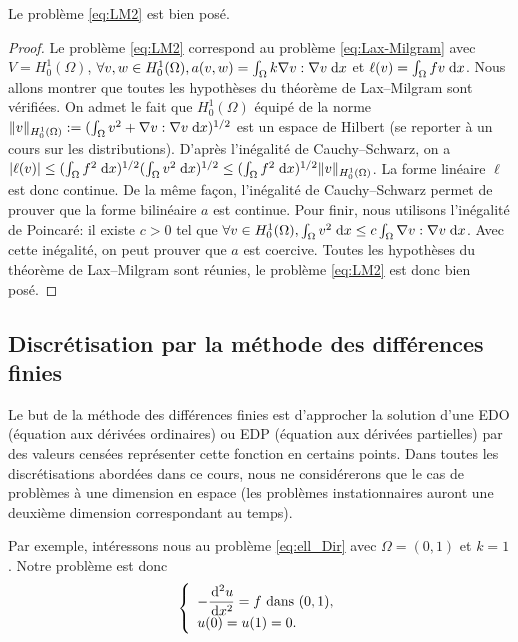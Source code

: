 \documentclass[12pt,a4paper,twoside]{article}
\begin{document}
\begin{proposition}
  Le probl\`eme \eqref{eq:LM2} est bien pos\'e.
\end{proposition}
\begin{proof}
  Le probl\`eme \eqref{eq:LM2} correspond au probl\`eme \eqref{eq:Lax-Milgram}
  avec $V = H_0^1(\Omega)$, 
  $\forall v, w \in H_0^1(\Omega), a(v,w) = \int_{\Omega} k \nabla v : \nabla v \;\mathrm{d} x$
  et $\ell(v) = \int_{\Omega} f v \;\mathrm{d} x$.
  Nous allons montrer que toutes les hypoth\`eses du th\'eor\`eme de Lax--Milgram
  sont v\'erifi\'ees.
  On admet le fait que $H_0^1(\Omega)$ \'equip\'e de la norme 
  $\| v \|_{H_0^1(\Omega)} := (\int_{\Omega} v^2 + \nabla v : \nabla v \;\mathrm{d} x)^{1/2}$ 
  est un espace de Hilbert (se reporter \`a un cours sur les distributions).
  D'apr\`es l'in\'egalit\'e de Cauchy--Schwarz, on a 
  $|\ell(v)| \leq (\int_{\Omega} f^2 \;\mathrm{d} x)^{1/2} (\int_{\Omega} v^2 \;\mathrm{d} x)^{1/2}
  \leq (\int_{\Omega} f^2 \;\mathrm{d} x)^{1/2} \| v \|_{H_0^1(\Omega)}$.
  La forme lin\'eaire $\ell$ est donc continue. 
  De la m\^eme fa\c{c}on, l'in\'egalit\'e de Cauchy--Schwarz permet de prouver
  que la forme bilin\'eaire $a$ est continue.
  Pour finir, nous utilisons l'in\'egalit\'e de Poincar\'e: il existe $c>0$
  tel que $\forall v \in H_0^1(\Omega), 
  \int_{\Omega} v^2 \;\mathrm{d} x \leq c \int_{\Omega} \nabla v : \nabla v \;\mathrm{d} x$.
  Avec cette in\'egalit\'e, on peut prouver que $a$ est coercive.
  Toutes les hypoth\`eses du th\'eor\`eme de Lax--Milgram sont r\'eunies,
  le probl\`eme \eqref{eq:LM2} est donc bien pos\'e.
\end{proof}



\subsection{Discr\'etisation par la m\'ethode des diff\'erences finies}
\label{subsec:ell_DF}

Le but de la m\'ethode des diff\'erences finies est d'approcher la solution 
d'une EDO (\'equation aux d\'eriv\'ees ordinaires) ou EDP
(\'equation aux d\'eriv\'ees partielles) par des valeurs cens\'ees repr\'esenter
cette fonction en certains points. Dans toutes les discr\'etisations abord\'ees dans ce cours,
nous ne consid\'ererons que le cas de probl\`emes \`a une dimension en espace
(les probl\`emes instationnaires auront une deuxi\`eme dimension correspondant au temps).

Par exemple, int\'eressons nous au probl\`eme \eqref{eq:ell_Dir} avec $\Omega = (0,1)$
et $k = 1$.
Notre probl\`eme est donc
\begin{equation}
  \label{eq:ell_1d}
  \left\{
    \begin{array}{l}
      - \dfrac{\!\;\mathrm{d}^2 u}{\!\;\mathrm{d} x^2} = f \text{ dans } (0,1) ,
      \\
      u(0) = u(1) = 0 .
    \end{array}
  \right.
\end{equation}
\end{document}
